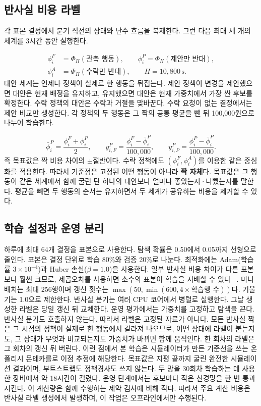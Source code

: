 \subsection{반사실 비용 라벨}
\label{sec:arch-labels}
각 표본 결정에서 분기 직전의 상태와 난수 흐름을 복제한다. 그런 다음 최대 세 개의
세계를 3시간 동안 실행한다.

\begin{equation}
\begin{aligned}
\phi_i^F&=\Phi_H(\text{관측 행동}),\qquad
\phi_i^P=\Phi_H(\text{제안만 반대}),\\
\phi_i^A&=\Phi_H(\text{수락만 반대}),\qquad H=10{,}800\,\mathrm{s}.
\end{aligned}
\end{equation}
대안 세계는 언제나 정책이 실제로 한 행동을 뒤집는다. 제안 정책이 변경을 제안했으면
대안은 현재 배정을 유지하고, 유지했으면 대안은 현재 가중치에서 가장 싼 후보를
확정한다. 수락 정책의 대안은 수락과 거절을 맞바꾼다. 수락 요청이 없는 결정에서는
제안 비교만 생성한다. 각 정책의 두 행동은 그 짝의 공통 평균을 뺀 뒤 100,000원으로
나누어 학습한다.

\begin{equation}
\bar\phi_i^P=\frac{\phi_i^F+\phi_i^P}{2},\qquad
y_{i,F}^P=\frac{\phi_i^F-\bar\phi_i^P}{100{,}000},\qquad
y_{i,P}^P=\frac{\phi_i^P-\bar\phi_i^P}{100{,}000}.
\end{equation}
즉 목표값은 짝 비용 차이의 $\pm$절반이다. 수락 정책에도 $(\phi_i^F,\phi_i^A)$를 이용한
같은 중심화를 적용한다. 따라서 기준점은 고정된 어떤 행동이 아니라 \textbf{짝 자체}다.
목표값은 그 행동이 같은 세계에서 함께 굴린 단 하나의 대안보다 얼마나 좋았는지·나빴는지를
말한다. 평균을 빼면 두 행동의 순서는 유지하면서 두 세계가 공유하는 비용을 제거할 수
있다.

\subsection{학습 설정과 운영 분리}
\label{sec:arch-train}
하루에 최대 64개 결정을 표본으로 사용한다. 탐색 확률은 0.50에서 0.05까지 선형으로
줄인다. 표본은 결정 단위로 학습 80\%와 검증 20\%로 나눈다. 최적화에는 Adam(학습률
$3\times10^{-4}$)과 Huber 손실($\beta=1.0$)을 사용한다. 일부 반사실 비용 차이가 다른
표본보다 훨씬 크므로, 제곱오차를 사용하면 소수의 표본이 학습을 지배할 수 있다
~\cite{refhuber}. 미니배치는 최대 256행이며 갱신 횟수는
$\max(50,\min(600,4\times\text{학습행 수}))$다. 기울기는 1.0으로 제한한다.
반사실 분기는 여러 CPU 코어에서 병렬로 실행한다. 그날 생성한 라벨은 당일 갱신 뒤
교체한다. 운영 평가에서는 가중치를 고정하고 탐색을 끈다. 반사실 분기도 호출하지 않는다.
따라서 라벨은 고정된 자료가 아니다. 모든 반사실 짝은 그 시점의 정책이 실제로 한
행동에서 갈라져 나오므로, 어떤 상태에 라벨이 붙는지도, 그 상태가 무엇과 비교되는지도
가중치가 바뀌면 함께 움직인다. 한 회차의 라벨은 그 회차의 갱신 뒤 버린다. 이런 점에서
본 학습은 시뮬레이터가 만든 기준선을 쓰는 온폴리시 몬테카를로 이점 추정에 해당한다.
목표값은 지평 끝까지 굴린 완전한 시뮬레이션 결과이며, 부트스트랩도 정책경사도 쓰지
않는다.
두 망을 30회차 학습하는 데 사용한 장비에서 약 18시간이 걸렸다. 운영 단계에서는 후보마다 작은
신경망을 한 번 통과시킨다. 이 계산량은 함께 수행하는 제약 검사에 비해 작다. 따라서
주요 계산 비용은 반사실 라벨 생성에서 발생하며, 이 작업은 오프라인에서만 수행된다.
